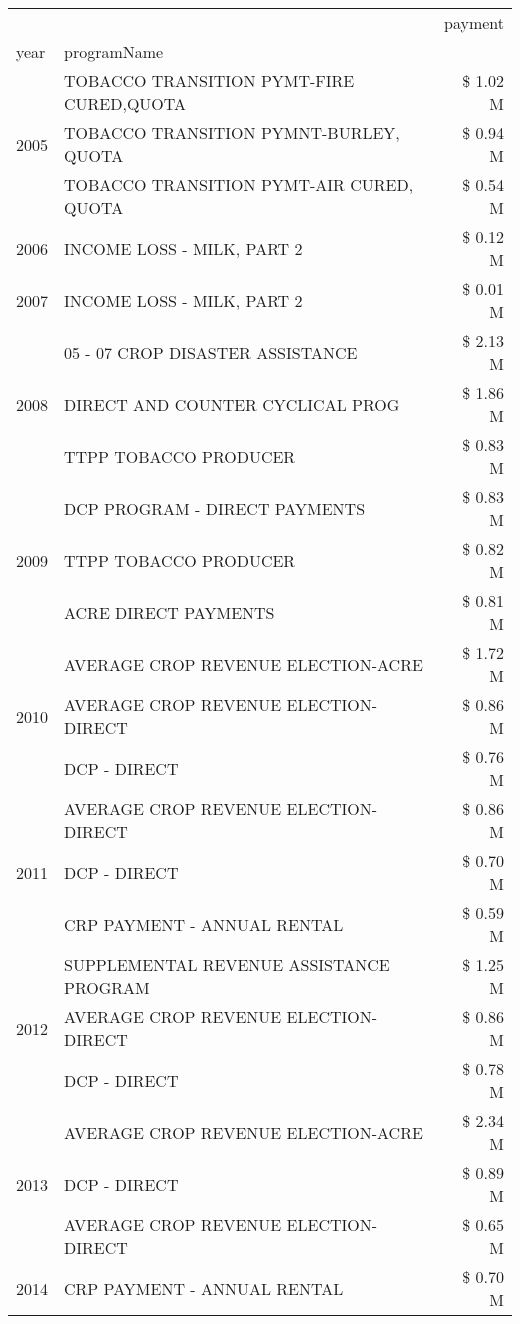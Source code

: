 \begin{tabular}{llr}
\toprule
 &  & payment \\
year & programName &  \\
\midrule
\multirow[t]{3}{*}{2005} & TOBACCO TRANSITION PYMT-FIRE CURED,QUOTA & \$ 1.02 M \\
 & TOBACCO TRANSITION PYMNT-BURLEY, QUOTA & \$ 0.94 M \\
 & TOBACCO TRANSITION PYMT-AIR CURED, QUOTA & \$ 0.54 M \\
\cline{1-3}
2006 & INCOME LOSS - MILK, PART 2 & \$ 0.12 M \\
\cline{1-3}
2007 & INCOME LOSS - MILK, PART 2 & \$ 0.01 M \\
\cline{1-3}
\multirow[t]{3}{*}{2008} & 05 - 07 CROP DISASTER ASSISTANCE & \$ 2.13 M \\
 & DIRECT AND COUNTER CYCLICAL PROG & \$ 1.86 M \\
 & TTPP TOBACCO PRODUCER & \$ 0.83 M \\
\cline{1-3}
\multirow[t]{3}{*}{2009} & DCP PROGRAM - DIRECT PAYMENTS & \$ 0.83 M \\
 & TTPP TOBACCO PRODUCER & \$ 0.82 M \\
 & ACRE DIRECT PAYMENTS & \$ 0.81 M \\
\cline{1-3}
\multirow[t]{3}{*}{2010} & AVERAGE CROP REVENUE ELECTION-ACRE & \$ 1.72 M \\
 & AVERAGE CROP REVENUE ELECTION-DIRECT & \$ 0.86 M \\
 & DCP - DIRECT & \$ 0.76 M \\
\cline{1-3}
\multirow[t]{3}{*}{2011} & AVERAGE CROP REVENUE ELECTION-DIRECT & \$ 0.86 M \\
 & DCP - DIRECT & \$ 0.70 M \\
 & CRP PAYMENT - ANNUAL RENTAL & \$ 0.59 M \\
\cline{1-3}
\multirow[t]{3}{*}{2012} & SUPPLEMENTAL REVENUE ASSISTANCE PROGRAM & \$ 1.25 M \\
 & AVERAGE CROP REVENUE ELECTION-DIRECT & \$ 0.86 M \\
 & DCP - DIRECT & \$ 0.78 M \\
\cline{1-3}
\multirow[t]{3}{*}{2013} & AVERAGE CROP REVENUE ELECTION-ACRE & \$ 2.34 M \\
 & DCP - DIRECT & \$ 0.89 M \\
 & AVERAGE CROP REVENUE ELECTION-DIRECT & \$ 0.65 M \\
\cline{1-3}
\multirow[t]{3}{*}{2014} & CRP PAYMENT - ANNUAL RENTAL & \$ 0.70 M \\

\end{tabular}
